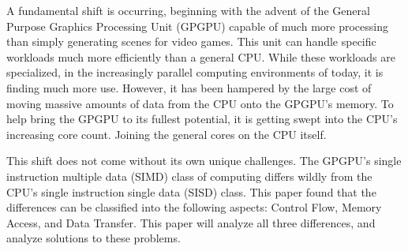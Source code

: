A fundamental shift is occurring, beginning with the advent of the General Purpose Graphics Processing Unit (GPGPU) capable of much more processing than simply generating scenes for video games. This unit can handle specific workloads much more efficiently than a general CPU. While these workloads are specialized, in the increasingly parallel computing environments of today, it is finding much more use. However, it has been hampered by the large cost of moving massive amounts of data from the CPU onto the GPGPU's memory. To help bring the GPGPU to its fullest potential, it is getting swept into the CPU's increasing core count. Joining the general cores on the CPU itself. 

This shift does not come without its own unique challenges. The GPGPU's single instruction multiple data (SIMD) class of computing differs wildly from the CPU's single instruction single data (SISD) class. This paper found that the differences can be classified into the following aspects: Control Flow, Memory Access, and Data Transfer. This paper will analyze all three differences, and analyze solutions to these problems. 